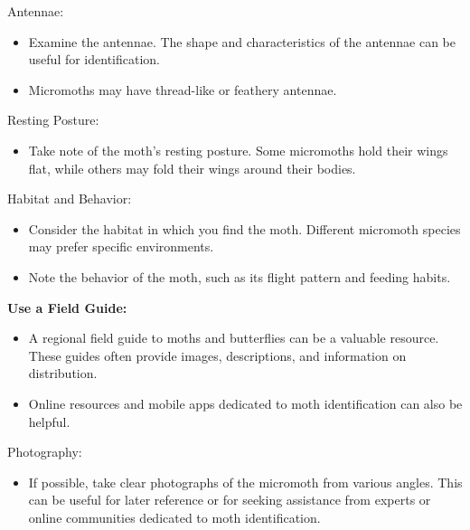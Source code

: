 \documentclass[
  ignorenonframetext,
]{beamer}
\providecommand{\tightlist}{%
  \setlength{\itemsep}{0pt}\setlength{\parskip}{0pt}}
\begin{document}
\begin{frame}{Antennae:}
\protect\hypertarget{antennae}{}
\begin{itemize}
\tightlist
\item
  Examine the antennae. The shape and characteristics of the antennae
  can be useful for identification.
\item
  Micromoths may have thread-like or feathery antennae.
\end{itemize}
\end{frame}

\begin{frame}{Resting Posture:}
\protect\hypertarget{resting-posture}{}
\begin{itemize}
\tightlist
\item
  Take note of the moth's resting posture. Some micromoths hold their
  wings flat, while others may fold their wings around their bodies.
\end{itemize}
\end{frame}

\begin{frame}{Habitat and Behavior:}
\protect\hypertarget{habitat-and-behavior}{}
\begin{itemize}
\tightlist
\item
  Consider the habitat in which you find the moth. Different micromoth
  species may prefer specific environments.
\item
  Note the behavior of the moth, such as its flight pattern and feeding
  habits.
\end{itemize}
\end{frame}

\begin{frame}{\textbf{Use a Field Guide:}}
\protect\hypertarget{use-a-field-guide}{}
\begin{itemize}
\tightlist
\item
  A regional field guide to moths and butterflies can be a valuable
  resource. These guides often provide images, descriptions, and
  information on distribution.
\item
  Online resources and mobile apps dedicated to moth identification can
  also be helpful.
\end{itemize}
\end{frame}

\begin{frame}{Photography:}
\protect\hypertarget{photography}{}
\begin{itemize}
\tightlist
\item
  If possible, take clear photographs of the micromoth from various
  angles. This can be useful for later reference or for seeking
  assistance from experts or online communities dedicated to moth
  identification.
\end{itemize}
\end{frame}
\end{document}
